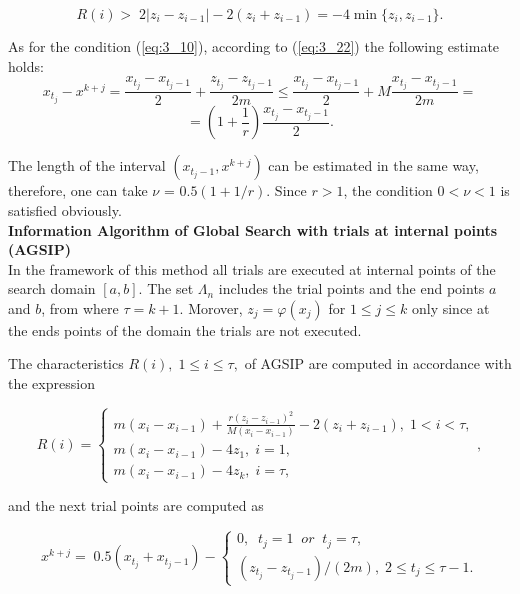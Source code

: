 	\begin{equation*}
	R(i)>\; 2\left|z_{i} -z_{i-1} \right|-2(z_{i} +z_{i-1} )=-4\min \{ z_{i} ,z_{i-1} \} .
	\end{equation*}
	
	As for the condition  (\ref{eq:3_10}), according to  (\ref{eq:3_22}) the following estimate holds: 
	\begin{displaymath}
	x_{t_{j} } -x^{k+j} =\frac{x_{t_{j} } -x_{t_{j} -1} }{2} +\frac{z_{t_{j} } -z_{t_{j} -1} }{2m} \le \frac{x_{t_{j} } -x_{t_{j} -1} }{2} +M\frac{x_{t_{j} } -x_{t_{j} -1} }{2m} =
	\end{displaymath}
	\begin{displaymath}
	=\left(1+\frac{1}{r} \right)\frac{x_{t_{j} } -x_{t_{j} -1} }{2}. 
	\end{displaymath}
		
	The length of the interval $(x_{t_{j} -1} ,x^{k+j} )$ can be estimated in the same way, therefore, one can take $\nu$ = $0.5(1+1/r)$. Since $r>1$, the condition $0<\nu <1$ is satisfied obviously. \\
	
	\textbf{Information Algorithm of Global Search with trials at internal points (AGSIP)} \\
	
	In the framework of this method all trials are executed at internal points of the search domain $[a,b]$. The set $\Lambda _{n} $ includes the trial points and the end points $a$ and $b$, from where $\tau =k+1$. Morover, $z_{j} =\varphi (x_{j} )$ for $1\le j\le k$ only since at the ends points of the domain the trials are not executed.
	
	The characteristics $R(i),\; 1\le i\le \tau ,$ of AGSIP are computed in accordance with the expression
	
	\begin{equation}
	\label{eq:3_24}
	R(i)=
	\left\{
	\begin{array}{l} 
	{m(x_{i} -x_{i-1} )+\frac{r(z_{i} -z_{i-1} )^{2} }{M(x_{i} -x_{i-1} )} -2(z_{i} +z_{i-1} ),\; 1<i<\tau ,} \\ 
	{m(x_{i} -x_{i-1} )-4z_{1} ,\; i=1,} \\ 
	{m(x_{i} -x_{i-1} )-4z_{k} ,\; i=\tau ,} 
	\end{array}
	\right., 
	\end{equation}
	
	and the next trial points are computed as 
	
	\begin{equation}
	\label{eq:3_25}
	x^{k+j} =\; 0.5(x_{t_{j} } +x_{t_{j} -1} )-
	\left\{
	\begin{array}{l} 
		{0,\; \; t_{j} =1\; \; or \; \; t_{j} =\tau ,} \\ 
		{(z_{t_{j} } -z_{t_{j} -1} )/(2m),\; 2\le t_{j} \le \tau -1.} 
	\end{array}
	\right. 
	\end{equation}
	

